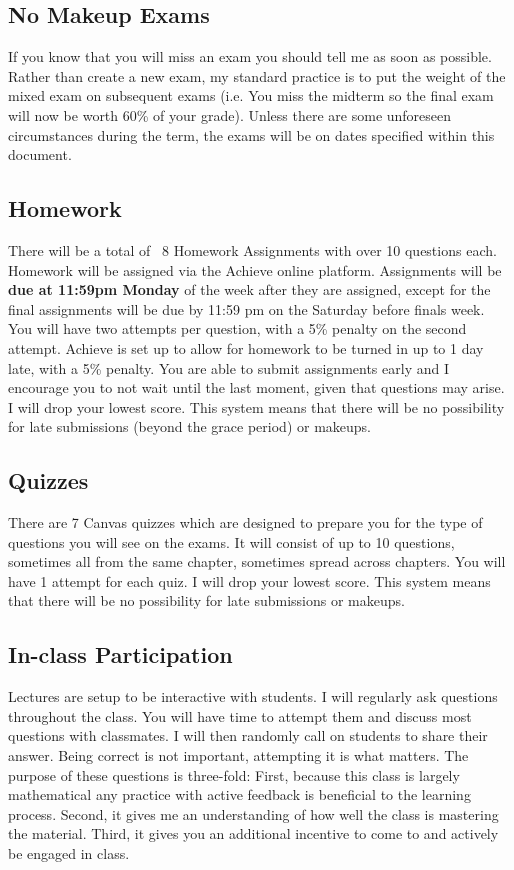 \subsection*{No Makeup Exams}
If you know that you will miss an exam you should tell me as soon as possible.
Rather than create a new exam, my standard practice is to put the weight of the mixed exam on subsequent exams
(i.e. You miss the midterm so the final exam will now be worth 60\% of your grade).
Unless there are some unforeseen circumstances during the term, the exams will be on dates specified within this document.

\hypertarget{grading_HW}{\subsection{Homework}}
There will be a total of ~8 Homework Assignments with over 10 questions each.
Homework will be assigned via the Achieve online platform.
Assignments will be \textbf{due at 11:59pm Monday} of the week after they are assigned, except for the final assignments will be due by 11:59 pm on the Saturday before finals week.
You will have two attempts per question, with a 5\% penalty on the second attempt.
Achieve is set up to allow for homework to be turned in up to 1 day late, with a 5\% penalty.
You are able to submit assignments early and I encourage you to not wait until the last moment, given that questions may arise.
I will drop your lowest score.
This system means that there will be no possibility for late submissions (beyond the grace period) or makeups.
 
\hypertarget{grading_quiz}{\subsection{Quizzes}}
There are 7 Canvas quizzes which are designed to prepare you for the type of questions you will see on the exams.
It will consist of up to 10 questions, sometimes all from the same chapter, sometimes spread across chapters.
You will have 1 attempt for each quiz. I will drop your lowest score.
This system means that there will be no possibility for late submissions or makeups.

\hypertarget{grading_participation}{\subsection{In-class Participation}}
Lectures are setup to be interactive with students.
I will regularly ask questions throughout the class.
You will have time to attempt them and discuss most questions with classmates.
I will then randomly call on students to share their answer.
Being correct is not important, attempting it is what matters.
The purpose of these questions is three-fold:
First, because this class is largely mathematical any practice with active feedback is beneficial to the learning process.
Second, it gives me an understanding of how well the class is mastering the material.
Third, it gives you an additional incentive to come to and actively be engaged in class.
